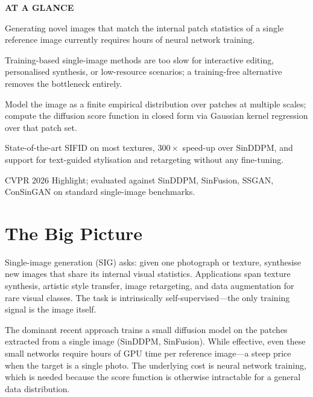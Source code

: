 \documentclass[10pt,twocolumn]{article}
\begin{document}
\begin{mdframed}[backgroundcolor=boxgray,linecolor=rulered,linewidth=1pt,
    innerleftmargin=6pt,innerrightmargin=6pt,
    innertopmargin=6pt,innerbottommargin=6pt]
\textbf{\small AT A GLANCE}\par\vspace{4pt}
\begin{description}[leftmargin=0pt,labelsep=4pt,itemsep=2pt,parsep=0pt,
    font=\small\bfseries]
  \item[Problem:] Generating novel images that match the internal patch
    statistics of a single reference image currently requires hours of neural
    network training.
  \item[Why it matters:] Training-based single-image methods are too slow for
    interactive editing, personalised synthesis, or low-resource scenarios;
    a training-free alternative removes the bottleneck entirely.
  \item[Method:] Model the image as a finite empirical distribution over patches
    at multiple scales; compute the diffusion score function in closed form via
    Gaussian kernel regression over that patch set.
  \item[Result:] State-of-the-art SIFID on most textures, $300\times$ speed-up
    over SinDDPM, and support for text-guided stylisation and retargeting without
    any fine-tuning.
  \item[Evidence:] CVPR 2026 Highlight; evaluated against SinDDPM, SinFusion,
    SSGAN, ConSinGAN on standard single-image benchmarks.
\end{description}
\end{mdframed}

\section{The Big Picture}

Single-image generation (SIG) asks: given one photograph or texture, synthesise
new images that share its internal visual statistics. Applications span
texture synthesis, artistic style transfer, image retargeting, and
data augmentation for rare visual classes. The task is intrinsically
self-supervised---the only training signal is the image itself.

The dominant recent approach trains a small diffusion model on the patches
extracted from a single image (SinDDPM, SinFusion). While effective, even
these small networks require hours of GPU time per reference image---a steep
price when the target is a single photo. The underlying cost is neural
network training, which is needed because the score function is otherwise
intractable for a general data distribution.
\end{document}
